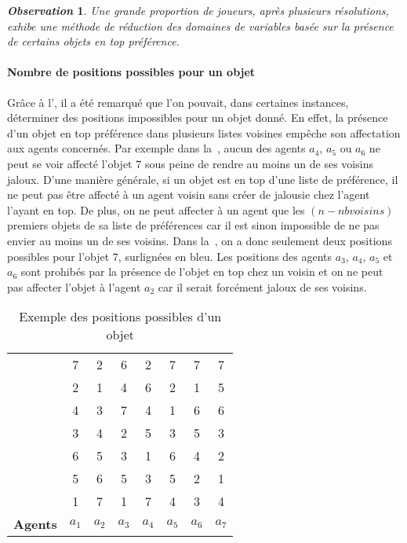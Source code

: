 \documentclass[a4paper, 11pt]{article}
\newcommand{\bb}[1]{\colorbox{blue!30}{#1}}
\newcommand{\rr}[1]{\colorbox{red!30}{#1}}
\newtheorem{observation}{\it\bfseries Observation}
\begin{document}
\begin{observation}
\label{obs-position}
    Une grande proportion de joueurs, après plusieurs résolutions, exhibe une méthode de réduction des domaines de variables basée sur la présence de certains objets en top préférence. 
\end{observation}

\paragraph{Nombre de positions possibles pour un objet}{Grâce à l', il a été remarqué que l'on pouvait, dans certaines instances, déterminer des positions impossibles pour un objet donné. En effet, la présence d'un objet en top préférence dans plusieurs listes voisines empêche son affectation aux agents concernés. Par exemple dans la~, aucun des agents $a_4$, $a_5$ ou $a_6$ ne peut se voir affecté l'objet $7$ sous peine de rendre au moins un de ses voisins jaloux. D'une manière générale, si un objet est en top d'une liste de préférence, il ne peut pas être affecté à un agent voisin sans créer de jalousie chez l'agent l'ayant en top. De plus, on ne peut affecter à un agent que les $(n-nbvoisins)$ premiers objets de sa liste de préférences car il est sinon impossible de ne pas envier au moins un de ses voisins. Dans la~, on a donc seulement deux positions possibles pour l'objet $7$, surlignées en \bb{bleu}. Les positions des agents $a_3$, $a_4$, $a_5$ et $a_6$ sont prohibés par la présence de l'objet en top chez un voisin et on ne peut pas affecter l'objet à l'agent $a_2$ car il serait forcément jaloux de ses voisins.

    \begin{table}[h!]
	    \centering
		\begin{tabular}{c|c c c c c c c|}
			
			&\bb{7} & 2 & 6 & 2 & \rr{7} & \rr{7} & \rr{7} \\
			&2 & 1 & 4 & 6 & 2 & 1 & 5 \\
			&4 & 3 & \bb{7} & 4 & 1 & 6 & 6 \\
			&3 & 4 & 2 & 5 & 3 & 5 & 3 \\
			&6 & 5 & 3 & 1 & 6 & 4 & 2 \\
			&5 & 6 & 5 & 3 & 5 & 2 & 1 \\
			&1 & \rr{7} & 1 & \rr{7} & 4 & 3 & 4 \\
			\hline
			\textbf{Agents} & $a_1$ & $a_2$ & $a_3$ & $a_4$ & $a_5$ & $a_6$ & $a_7$
			
		\end{tabular}
		\caption{Exemple des positions possibles d'un objet}
		\label{fig-exemple2}
	\end{table}
}
	
\end{document}
